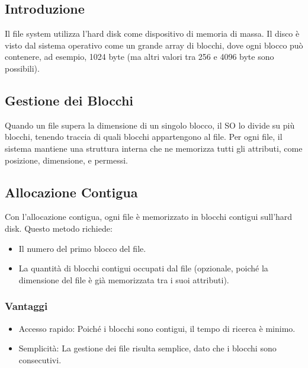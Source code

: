 \subsection{Introduzione}
Il file system utilizza l'hard disk come dispositivo di memoria di massa. Il disco è visto dal sistema operativo come un grande array di blocchi, dove ogni blocco può contenere, ad esempio, 1024 byte (ma altri valori tra 256 e 4096 byte sono possibili).


\subsection{Gestione dei Blocchi}
Quando un file supera la dimensione di un singolo blocco, il SO lo divide su più blocchi, tenendo traccia di quali blocchi appartengono al file. Per ogni file, il sistema mantiene una struttura interna che ne memorizza tutti gli attributi, come posizione, dimensione, e permessi.



\subsection{Allocazione Contigua}
Con l'allocazione contigua, ogni file è memorizzato in blocchi contigui sull'hard disk. Questo metodo richiede:
\begin{itemize}
    \item Il numero del primo blocco del file.
    \item La quantità di blocchi contigui occupati dal file (opzionale, poiché la dimensione del file è già memorizzata tra i suoi attributi).
\end{itemize}


\subsubsection{Vantaggi}
\begin{itemize}
    \item Accesso rapido: Poiché i blocchi sono contigui, il tempo di ricerca è minimo.
    \item Semplicità: La gestione dei file risulta semplice, dato che i blocchi sono consecutivi.
\end{itemize}

